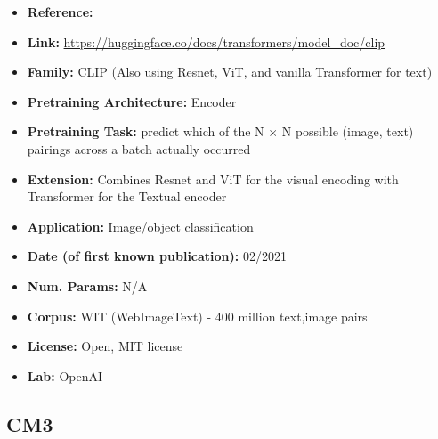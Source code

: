 \documentclass{article}
\begin{document}
            \begin{itemize}
                \item \textbf{Reference:} 
                \item \textbf{Link:} \url{https://huggingface.co/docs/transformers/model_doc/clip}
                \item \textbf{Family:} CLIP (Also using Resnet, ViT, and vanilla Transformer for text) 
                \item \textbf{Pretraining Architecture:} Encoder
                \item \textbf{Pretraining Task:} predict which of the N × N possible (image, text) pairings across a batch actually occurred
                \item \textbf{Extension:} Combines Resnet and ViT for the visual encoding with Transformer for the Textual encoder  
                \item \textbf{Application:} Image/object classification
                \item \textbf{Date (of first known publication):} 02/2021
                \item \textbf{Num. Params:} N/A
                \item \textbf{Corpus:} WIT (WebImageText) - 400 million text,image pairs
                \item \textbf{License:} Open, MIT license
                \item \textbf{Lab:} OpenAI
            \end{itemize}     

\subsection{CM3}
\end{document}
